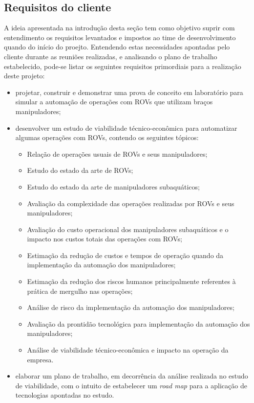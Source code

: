 \subsection{Requisitos do cliente}
\label{ssec:reqcli-s}
A ideia apresentada na introdução desta seção tem como objetivo suprir com entendimento os requisitos levantados e impostos ao time de desenvolvimento quando do início do proejto.
Entendendo estas necessidades apontadas pelo cliente durante as reuniões realizadas, e analisando o plano de trabalho estabelecido, pode-se listar os seguintes requisitos primordiais para a realização deste projeto:
\begin{itemize}
	\item projetar, construir e demonstrar uma prova de conceito em laboratório para simular a automação de operações com ROVs que utilizam braços manipuladores;
	\item desenvolver um estudo de viabilidade técnico-econômica para automatizar algumas operações com ROVs, contendo os seguintes tópicos:
		\begin{itemize}
			\item Relação de operações usuais de ROVs e seus manipuladores;
			\item Estudo do estado da arte de ROVs;
			\item Estudo do estado da arte de manipuladores subaquáticos;
			\item Avaliação da complexidade das operações realizadas por ROVs e seus manipuladores;
			\item Avaliação do custo operacional dos manipuladores subaquáticos e o impacto nos custos totais das operações com ROVs;
			\item Estimação da redução de custos e tempos de operação quando da implementação da automação dos manipuladores;
			\item Estimação da redução dos riscos humanos principalmente referentes à prática de mergulho nas operações;
			\item Análise de risco da implementação da automação dos manipuladores;
			\item Avaliação da prontidão tecnológica para implementação da automação dos manipuladores;
			\item Análise de viabilidade técnico-econômica e impacto na operação da empresa.
		\end{itemize}
	\item elaborar um plano de trabalho, em decorrência da análise realizada no estudo de viabilidade, com o intuito de estabelecer um \textit{road map} para a aplicação de tecnologias apontadas no estudo.
\end{itemize}

